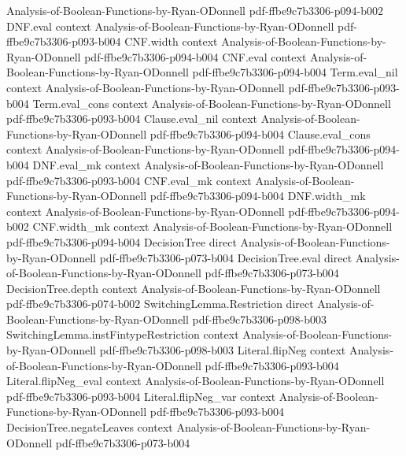 \begin{lemma}
  {Analysis-of-Boolean-Functions-by-Ryan-ODonnell}
  {pdf-ffbe9c7b3306-p094-b002}
\proofstep
  {DNF.eval}
  {context}
  {Analysis-of-Boolean-Functions-by-Ryan-ODonnell}
  {pdf-ffbe9c7b3306-p093-b004}
\proofstep
  {CNF.width}
  {context}
  {Analysis-of-Boolean-Functions-by-Ryan-ODonnell}
  {pdf-ffbe9c7b3306-p094-b004}
\proofstep
  {CNF.eval}
  {context}
  {Analysis-of-Boolean-Functions-by-Ryan-ODonnell}
  {pdf-ffbe9c7b3306-p094-b004}
\proofstep
  {Term.eval_nil}
  {context}
  {Analysis-of-Boolean-Functions-by-Ryan-ODonnell}
  {pdf-ffbe9c7b3306-p093-b004}
\proofstep
  {Term.eval_cons}
  {context}
  {Analysis-of-Boolean-Functions-by-Ryan-ODonnell}
  {pdf-ffbe9c7b3306-p093-b004}
\proofstep
  {Clause.eval_nil}
  {context}
  {Analysis-of-Boolean-Functions-by-Ryan-ODonnell}
  {pdf-ffbe9c7b3306-p094-b004}
\proofstep
  {Clause.eval_cons}
  {context}
  {Analysis-of-Boolean-Functions-by-Ryan-ODonnell}
  {pdf-ffbe9c7b3306-p094-b004}
\proofstep
  {DNF.eval_mk}
  {context}
  {Analysis-of-Boolean-Functions-by-Ryan-ODonnell}
  {pdf-ffbe9c7b3306-p093-b004}
\proofstep
  {CNF.eval_mk}
  {context}
  {Analysis-of-Boolean-Functions-by-Ryan-ODonnell}
  {pdf-ffbe9c7b3306-p094-b004}
\proofstep
  {DNF.width_mk}
  {context}
  {Analysis-of-Boolean-Functions-by-Ryan-ODonnell}
  {pdf-ffbe9c7b3306-p094-b002}
\proofstep
  {CNF.width_mk}
  {context}
  {Analysis-of-Boolean-Functions-by-Ryan-ODonnell}
  {pdf-ffbe9c7b3306-p094-b004}
\proofstep
  {DecisionTree}
  {direct}
  {Analysis-of-Boolean-Functions-by-Ryan-ODonnell}
  {pdf-ffbe9c7b3306-p073-b004}
\proofstep
  {DecisionTree.eval}
  {direct}
  {Analysis-of-Boolean-Functions-by-Ryan-ODonnell}
  {pdf-ffbe9c7b3306-p073-b004}
\proofstep
  {DecisionTree.depth}
  {context}
  {Analysis-of-Boolean-Functions-by-Ryan-ODonnell}
  {pdf-ffbe9c7b3306-p074-b002}
\proofstep
  {SwitchingLemma.Restriction}
  {direct}
  {Analysis-of-Boolean-Functions-by-Ryan-ODonnell}
  {pdf-ffbe9c7b3306-p098-b003}
\proofstep
  {SwitchingLemma.instFintypeRestriction}
  {context}
  {Analysis-of-Boolean-Functions-by-Ryan-ODonnell}
  {pdf-ffbe9c7b3306-p098-b003}
\proofstep
  {Literal.flipNeg}
  {context}
  {Analysis-of-Boolean-Functions-by-Ryan-ODonnell}
  {pdf-ffbe9c7b3306-p093-b004}
\proofstep
  {Literal.flipNeg_eval}
  {context}
  {Analysis-of-Boolean-Functions-by-Ryan-ODonnell}
  {pdf-ffbe9c7b3306-p093-b004}
\proofstep
  {Literal.flipNeg_var}
  {context}
  {Analysis-of-Boolean-Functions-by-Ryan-ODonnell}
  {pdf-ffbe9c7b3306-p093-b004}
\proofstep
  {DecisionTree.negateLeaves}
  {context}
  {Analysis-of-Boolean-Functions-by-Ryan-ODonnell}
  {pdf-ffbe9c7b3306-p073-b004}
\proofstep

\end{lemma}
